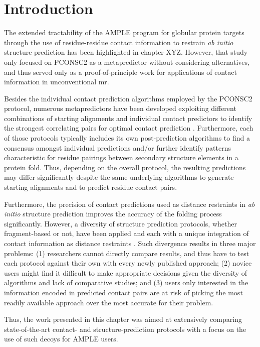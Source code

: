 \section{Introduction}
The extended tractability of the AMPLE program for globular protein targets through the use of residue-residue contact information to restrain \textit{ab initio} structure prediction has been highlighted in chapter XYZ. However, that study only focused on PCONSC2 as a metapredictor without considering alternatives, and thus served only as a proof-of-principle work for applications of contact information in unconventional \gls{mr}.

Besides the individual contact prediction algorithms employed by the PCONSC2 protocol, numerous metapredictors have been developed exploiting different combinations of starting alignments and individual contact predictors to identify the strongest correlating pairs for optimal contact prediction \cite{Kamisetty2013-le,Skwark2014-qp,Jones2015-vq,Ma2015-vo,He2017-fn,Michel2017-pm,Wang2017-rx}. Furthermore, each of those protocols typically includes its own post-prediction algorithms to find a consensus amongst individual predictions and/or further identify patterns characteristic for residue pairings between secondary structure elements in a protein fold. Thus, depending on the overall protocol, the resulting predictions may differ significantly despite the same underlying algorithms to generate starting alignments and to predict residue contact pairs.

Furthermore, the precision of contact predictions used as distance restraints in \textit{ab initio} structure prediction improves the accuracy of the folding process significantly. However, a diversity of structure prediction protocols, whether fragment-based or not, have been applied and each with a unique integration of contact information as distance restraints \cite{Marks2011-os,Michel2014-eg,Adhikari2015-lb,Jones2015-vq,Ovchinnikov2015-tn,Adhikari2018-lj}. Such divergence results in three major problems: (1) researchers cannot directly compare results, and thus have to test each protocol against their own with every newly published approach; (2) novice users might find it difficult to make appropriate decisions given the diversity of algorithms and lack of comparative studies; and (3) users only interested in the information encoded in predicted contact pairs are at risk of picking the most readily available approach over the most accurate for their problem.

Thus, the work presented in this chapter was aimed at extensively comparing state-of-the-art contact- and structure-prediction protocols with a focus on the use of such decoys for AMPLE users.

